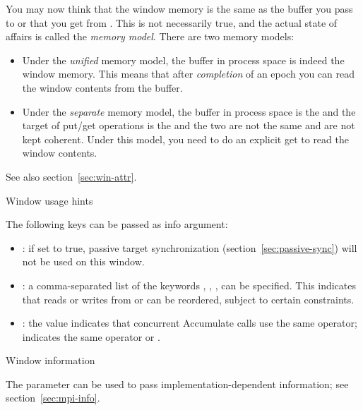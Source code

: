 You may now think that the window memory is the same as the buffer you
pass to  or that you get from
. This is not necessarily true, and the
actual state of affairs is called the \emph{memory
  model}. There are two memory models:
\begin{itemize}
\item Under the \emph{unified} memory
  model, the buffer in process space is indeed the window memory. This
  means that after \emph{completion} of an
  epoch you can read the window contents from the buffer.
\item Under the \emph{separate} memory
  model, the buffer in process space is the
   and the target of put/get operations
  is the  and the two are not the same
  and are not kept coherent. Under this model, you need to do an
  explicit get to read the window contents.
\end{itemize}
See also section~\ref{sec:win-attr}.

 {Window usage hints}
\label{sec:window-info}

The following keys can be passed as info argument:
\begin{itemize}
\item {}: if set to true, passive target synchronization
  (section~\ref{sec:passive-sync}) will not be used on this window.
\item {}: a comma-separated list of
  the keywords , ,
  ,  can be specified. This
  indicates that reads or writes from  or
   can be reordered, subject to
  certain constraints.
\item {}: the value 
  indicates that concurrent Accumulate calls use the same operator;
   indicates the same operator or
  .
\end{itemize}

 {Window information}
\label{sec:win-attr}

The  parameter can be used to pass implementation-dependent 
information; see section~\ref{sec:mpi-info}.

